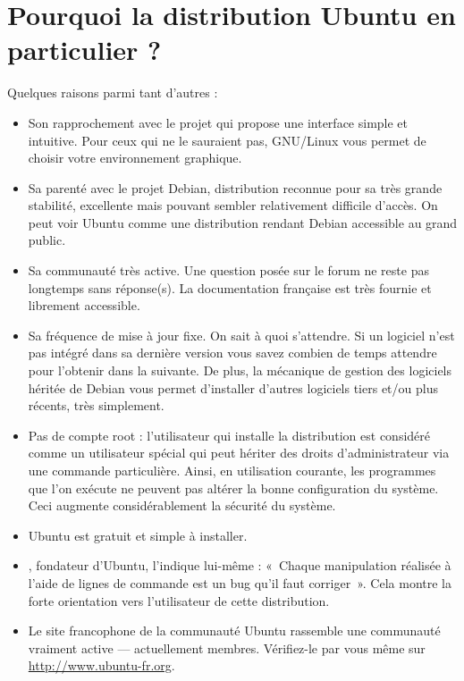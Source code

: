 \section{Pourquoi la distribution Ubuntu en particulier ?}
Quelques raisons parmi tant d'autres :
\begin{itemize}
\item Son rapprochement avec le projet  qui propose une interface simple et intuitive. Pour ceux qui ne le sauraient pas, GNU/Linux vous permet de choisir votre environnement graphique.
\item Sa parenté avec le projet Debian, distribution reconnue pour sa très grande stabilité, excellente mais pouvant sembler relativement difficile d'accès. On peut voir Ubuntu comme une distribution rendant Debian accessible au grand public.
\item Sa communauté très active. Une question posée sur le forum ne reste pas longtemps sans réponse(s). La documentation française est très fournie et librement accessible.
\item Sa fréquence de mise à jour fixe. On sait à quoi s'attendre. Si un logiciel n'est pas intégré dans sa dernière version vous savez combien de temps attendre pour l'obtenir dans la suivante. De plus, la mécanique de gestion des logiciels héritée de Debian vous permet d'installer d'autres logiciels tiers et/ou plus récents, très simplement.
\item Pas de compte root : l'utilisateur qui installe la distribution est considéré comme un utilisateur spécial qui peut hériter des droits d'administrateur via une commande particulière. Ainsi, en utilisation courante, les programmes que l'on exécute ne peuvent pas altérer la bonne configuration du système. Ceci augmente considérablement la sécurité du système.
\item Ubuntu est gratuit et simple à installer.
\item {}, fondateur d'Ubuntu, l'indique lui-même : «~Chaque manipulation réalisée à l'aide de lignes de commande est un bug qu'il faut corriger~». Cela montre la forte orientation vers l'utilisateur de cette distribution.
\item Le site francophone de la communauté Ubuntu rassemble une communauté vraiment active --- actuellement \NbMembresUbuntufr{} membres. Vérifiez-le par vous même sur \url{http://www.ubuntu-fr.org}.
\end{itemize}
